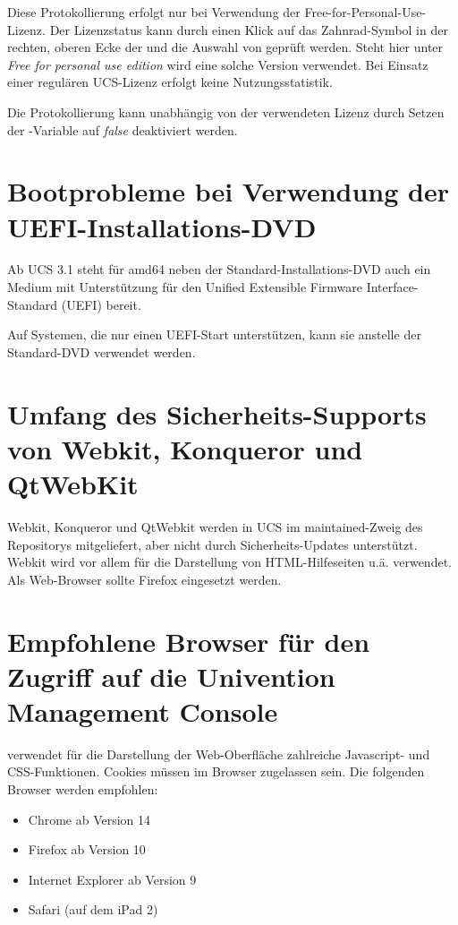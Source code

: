 Diese Protokollierung erfolgt nur bei Verwendung der 
Free-for-Personal-Use-Lizenz. Der Lizenzstatus kann durch einen
Klick auf das Zahnrad-Symbol in der rechten, oberen Ecke der \ucsUMC{}
und die Auswahl von  geprüft werden. Steht hier
unter  \emph{Free for personal use edition}
wird eine solche Version verwendet. Bei Einsatz einer regulären
UCS-Lizenz erfolgt keine Nutzungsstatistik.

Die Protokollierung kann unabhängig von der verwendeten Lizenz durch
Setzen der \ucsUCR{}-Variable   auf \emph{false} deaktiviert
werden.

\section{Bootprobleme bei Verwendung der UEFI-Installations-DVD}
Ab UCS 3.1 steht für amd64 neben der Standard-Installations-DVD auch
ein Medium mit Unterstützung für den Unified Extensible Firmware
Interface-Standard (UEFI) bereit.

Auf Systemen, die nur einen UEFI-Start unterstützen, kann sie anstelle
der Standard-DVD verwendet werden.

\section{Umfang des Sicherheits-Supports von Webkit, Konqueror und QtWebKit}
Webkit, Konqueror und QtWebkit werden in UCS im maintained-Zweig des
Repositorys mitgeliefert, aber nicht durch Sicherheits-Updates
unterstützt. Webkit wird vor allem für die Darstellung von
HTML-Hilfeseiten u.ä. verwendet. Als Web-Browser sollte Firefox
eingesetzt werden.

\section{Empfohlene Browser für den Zugriff auf die Univention Management Console}

\ucsUMC{} verwendet für die Darstellung der Web-Oberfläche zahlreiche
Javascript- und CSS-Funktionen. Cookies müssen im Browser zugelassen
sein. Die folgenden Browser werden empfohlen:

\begin{itemize}
\item Chrome ab Version 14
\item Firefox ab Version 10
\item Internet Explorer ab Version 9
\item Safari (auf dem iPad 2)
\end{itemize}


